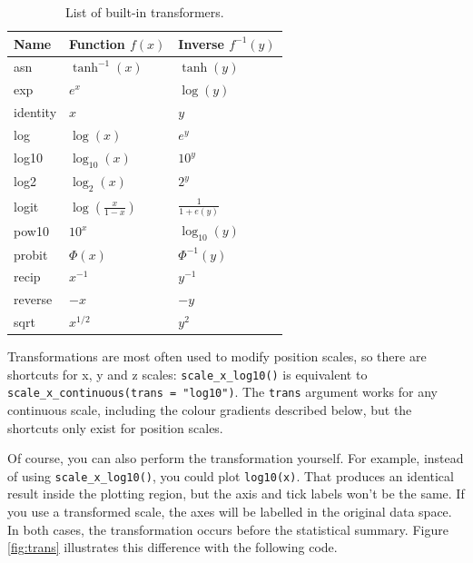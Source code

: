 \begin{table}
  \centering
  \begin{tabular}{lll}
    \toprule
    Name & Function $f(x)$ & Inverse $f^{-1}(y)$ \\
    \midrule
    asn       & $\tanh^{-1}(x)$ & $\tanh(y)$ \\
    exp       & $e ^ x$         & $\log(y)$  \\
    identity  & $x$             & $y$        \\
    log       & $\log(x)$       & $e ^ y$    \\
    log10     & $\log_{10}(x)$  & $10 ^ y$   \\
    log2      & $\log_2(x)$     & $2 ^ y$    \\
    logit     & $\log(\frac{x}{1 - x})$ & $\frac{1}{1 + e(y)} $ \\
    pow10     & $10^x$          & $\log_{10}(y) $ \\
    probit    & $\Phi(x)$       & $\Phi^{-1}(y)$ \\
    recip     & $x^{-1}$        & $y^{-1}$ \\
    reverse   & $-x$            & $-y$     \\
    sqrt      & $x^{1/2}$       & $y ^ 2$  \\
    \bottomrule
  \end{tabular}
  \caption{List of built-in transformers.}
  \label{tbl:common-trans}
\end{table}

Transformations are most often used to modify position scales, so there
are shortcuts for x, y and z scales: \texttt{scale\_x\_log10()} is
equivalent to \texttt{scale\_x\_continuous(trans = "log10")}. The
\texttt{trans} argument works for any continuous scale, including the
colour gradients described below, but the shortcuts only exist for
position scales.  

Of course, you can also perform the transformation yourself. For
example, instead of using \texttt{scale\_x\_log10()}, you could plot
\texttt{log10(x)}. That produces an identical result inside the plotting
region, but the axis and tick labels won't be the same. If you use a
transformed scale, the axes will be labelled in the original data space.
In both cases, the transformation occurs before the statistical summary.
Figure \ref{fig:trans} illustrates this difference with the following
code. 

